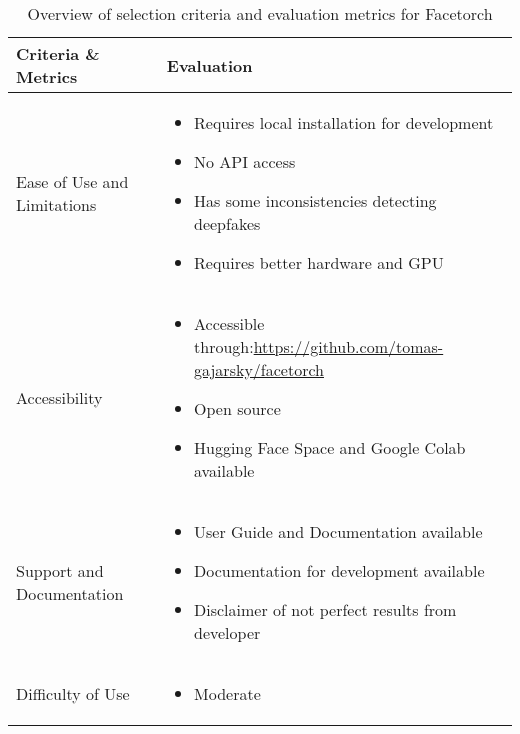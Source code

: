 \begin{table}[htpb]
	\caption{Overview of selection criteria and evaluation metrics for Facetorch}\label{tab:facetorch-overview}
	\centering
	\small
	\begin{tabularx}{\textwidth}{l X}
		\toprule
		\textbf{Criteria \& Metrics} & \textbf{Evaluation}                                                                \\
		\midrule
		Ease of Use and Limitations  & \begin{itemize}
			                               \item Requires local installation for development
			                               \item No \ac{API} access
			                               \item Has some inconsistencies detecting deepfakes
			                               \item Requires better hardware and \ac{GPU}
		                               \end{itemize}                                  \\
		\addlinespace
		Accessibility                & \begin{itemize}
			                               \item Accessible through:\newline \url{https://github.com/tomas-gajarsky/facetorch}
			                               \item Open source
			                               \item Hugging Face Space and Google Colab available
		                               \end{itemize} \\
		\addlinespace
		Support and Documentation    & \begin{itemize}
			                               \item User Guide and Documentation available
			                               \item Documentation for development available
			                               \item Disclaimer of not perfect results from developer
		                               \end{itemize}                              \\
		\addlinespace
		Difficulty of Use            & \begin{itemize}
			                               \item Moderate

\end{itemize}
\end{tabularx}
\end{table}
